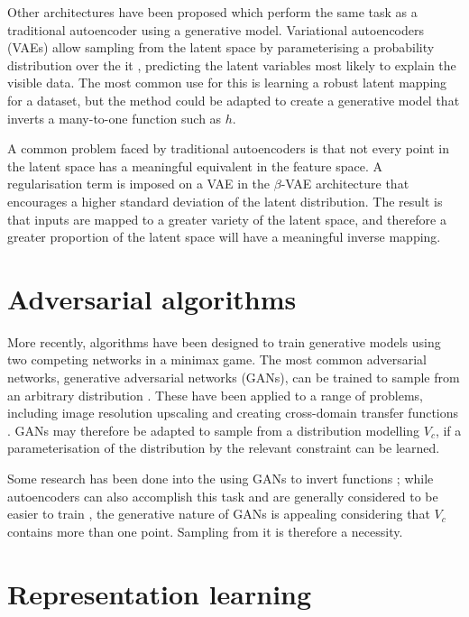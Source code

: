 \documentclass[../../main.tex]{subfiles}
\begin{document}
Other architectures have been proposed which perform the same task as a traditional autoencoder using a generative model.
Variational autoencoders (VAEs) allow sampling from the latent space by parameterising a probability distribution over the it \cite{kingma14}, predicting the latent variables most likely to explain the visible data.
The most common use for this is learning a robust latent mapping for a dataset, but the method could be adapted to create a generative model that inverts a many-to-one function such as $h$.

A common problem faced by traditional autoencoders is that not every point in the latent space has a meaningful equivalent in the feature space.
A regularisation term is imposed on a VAE in the $\beta$-VAE architecture \cite{higgins16} that encourages a higher standard deviation of the latent distribution.
The result is that inputs are mapped to a greater variety of the latent space, and therefore a greater proportion of the latent space will have a meaningful inverse mapping.

\section{Adversarial algorithms} \label{section:adversarialAlgorithms}

More recently, algorithms have been designed to train generative models using two competing networks in a minimax game.
The most common adversarial networks, generative adversarial networks (GANs), can be trained to sample from an arbitrary distribution \cite{goodfellow14, horger18}.
These have been applied to a range of problems, including image resolution upscaling \cite{ledig17} and creating cross-domain transfer functions \cite{zhu18}.
GANs may therefore be adapted to sample from a distribution modelling $V_c$, if a parameterisation of the distribution by the relevant constraint can be learned.

Some research has been done into the using GANs to invert functions \cite{anirudh18}; while autoencoders can also accomplish this task and are generally considered to be easier to train \cite{bang18}, the generative nature of GANs is appealing considering that $V_c$ contains more than one point.
Sampling from it is therefore a necessity.

\section{Representation learning} \label{section:representationLearning}
\end{document}
